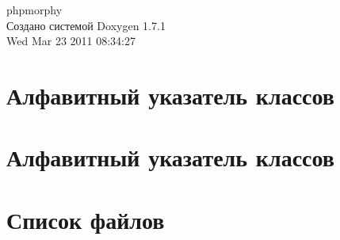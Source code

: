 \documentclass[a4paper]{book}
\begin{document}
\hypersetup{pageanchor=false}
\begin{titlepage}
\vspace*{7cm}
\begin{center}
{\Large phpmorphy }\\
\vspace*{1cm}
{\large Создано системой Doxygen 1.7.1}\\
\vspace*{0.5cm}
{\small Wed Mar 23 2011 08:34:27}\\
\end{center}
\end{titlepage}
\clearemptydoublepage
{}
\tableofcontents
\clearemptydoublepage
{}
\hypersetup{pageanchor=true}
\chapter{Алфавитный указатель классов}

\chapter{Алфавитный указатель классов}

\chapter{Список файлов}

\end{document}
